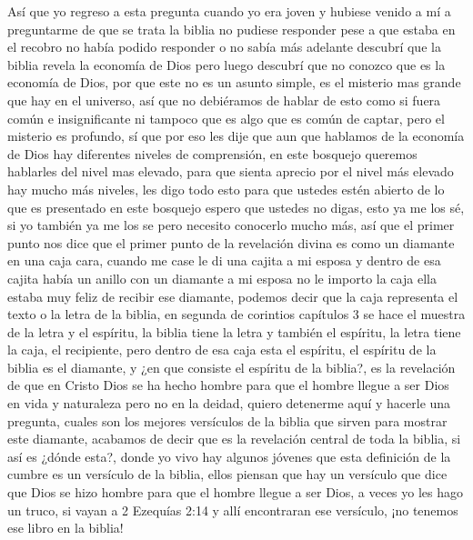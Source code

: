 \documentclass[12pt]{article}
\begin{document}
Así que yo regreso a esta pregunta cuando yo era joven y hubiese venido a mí a preguntarme de que se trata la biblia no pudiese responder pese a que estaba en el recobro no había podido responder o no sabía más adelante descubrí que  la biblia revela la economía de Dios pero luego descubrí que no conozco que es la economía de Dios, por que este no es un asunto simple, es el misterio mas grande que hay en el universo, así que no debiéramos de hablar de esto como si fuera común e insignificante ni tampoco que es algo que es común de captar, pero el misterio es profundo, sí que por eso les dije que aun que hablamos de la economía de Dios hay diferentes niveles de comprensión, en este bosquejo queremos hablarles del nivel mas elevado, para que sienta aprecio por el nivel más elevado hay mucho más niveles, les digo todo esto para que ustedes estén abierto de lo que es presentado en este bosquejo espero que ustedes no digas, esto ya me los sé, si yo también ya me los se pero necesito conocerlo mucho más, así que el primer punto nos dice que el primer punto de la revelación divina es como un diamante en una caja cara, cuando me case le di una cajita a mi esposa y dentro de esa cajita había un anillo con un diamante a mi esposa no le importo la caja ella estaba muy feliz de recibir ese diamante, podemos decir que la caja representa el texto o la letra de la biblia, en segunda de corintios capítulos 3 se hace el muestra de la letra y el espíritu, la biblia tiene la letra y también el espíritu, la letra tiene la caja, el recipiente, pero dentro de esa caja esta el espíritu, el espíritu de la biblia es el diamante, y  ¿en que consiste el espíritu de la biblia?, es la revelación de que en Cristo Dios se ha hecho hombre para que el hombre llegue a ser Dios en vida y naturaleza pero no en la deidad, quiero detenerme aquí y hacerle una pregunta, cuales son los mejores versículos de la biblia que sirven para mostrar este diamante, acabamos de decir que es la revelación central de toda la biblia, si así es ¿dónde esta?, donde yo vivo hay algunos jóvenes que esta definición de la cumbre es un versículo de la biblia, ellos piensan que hay un versículo que dice que Dios se hizo hombre para que el hombre llegue a  ser Dios, a veces yo les hago un truco, si vayan a 2 Ezequías 2:14 y allí encontraran ese versículo, ¡no tenemos ese libro en la biblia!\\
\end{document}

